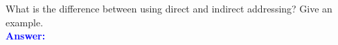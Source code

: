 \item{}
What is the difference between using direct and indirect addressing? Give an
example.\\[12pt]
\ifanswers
\textcolor{blue}{
\textbf{Answer:}\\
}
\newpage
\fi
